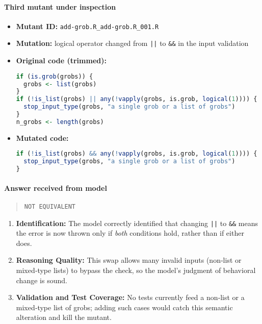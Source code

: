 \paragraph{Third mutant under inspection}
\begin{itemize}
  \item \textbf{Mutant ID:} \texttt{add-grob.R\_add-grob.R\_001.R}
  \item \textbf{Mutation:} logical operator changed from \texttt{||} to \texttt{\&\&} in the input validation
  \item \textbf{Original code (trimmed):}
    \begin{lstlisting}[language=R]
if (is.grob(grobs)) {
  grobs <- list(grobs)
}
if (!is_list(grobs) || any(!vapply(grobs, is.grob, logical(1)))) {
  stop_input_type(grobs, "a single grob or a list of grobs")
}
n_grobs <- length(grobs)
    \end{lstlisting}
  \item \textbf{Mutated code:}
    \begin{lstlisting}[language=R]
if (!is_list(grobs) && any(!vapply(grobs, is.grob, logical(1)))) {
  stop_input_type(grobs, "a single grob or a list of grobs")
}
    \end{lstlisting}
\end{itemize}

\paragraph{Answer received from model}
\begin{quote}
\texttt{NOT EQUIVALENT}
\end{quote}

\begin{enumerate}
  \item \textbf{Identification:}  
    The model correctly identified that changing \texttt{||} to \texttt{\&\&} means the error is now thrown only if \emph{both} conditions hold, rather than if either does.

  \item \textbf{Reasoning Quality:}  
    This swap allows many invalid inputs (non‐list or mixed‐type lists) to bypass the check, so the model’s judgment of behavioral change is sound.

  \item \textbf{Validation and Test Coverage:}  
    No tests currently feed a non‐list or a mixed‐type list of grobs; adding such cases would catch this semantic alteration and kill the mutant.
\end{enumerate}
